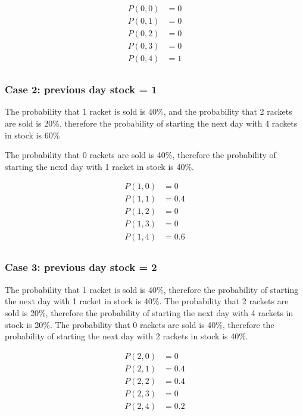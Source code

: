 \documentclass[12pt]{article}
\begin{document}
\begin{enumerate}
\begin{enumerate}
\begin{align*}
P(0, 0) &= 0 \\
P(0, 1) &= 0 \\
P(0, 2) &= 0 \\
P(0, 3) &= 0 \\
P(0, 4) &= 1 \\
\end{align*}

\subsubsection*{Case 2: previous day stock = 1}

The probability that 1 racket is sold is 40\%, and the probability that 2 rackets are sold is 20\%, therefore the probability of starting the next day with 4 rackets in stock is 60\%  

The probability that 0 rackets are sold is 40\%, therefore the probability of starting the nexd day with 1 racket in stock is 40\%.

\begin{align*}
P(1, 0) &= 0 \\
P(1, 1) &= 0.4 \\
P(1, 2) &= 0 \\
P(1, 3) &= 0 \\
P(1, 4) &= 0.6 \\
\end{align*}

\subsubsection*{Case 3: previous day stock = 2}

The probability that 1 racket is sold is 40\%, therefore the probability of starting the next day with 1 racket in stock is 40\%. The probability that 2 rackets are sold is 20\%, therefore the probability of starting the next day with 4 rackets in stock is 20\%. The probability that 0 rackets are sold is 40\%, therefore the probability of starting the next day with 2 rackets in stock is 40\%.

\begin{align*}
P(2, 0) &= 0 \\
P(2, 1) &= 0.4 \\
P(2, 2) &= 0.4 \\
P(2, 3) &= 0 \\
P(2, 4) &= 0.2 \\
\end{align*}


\end{enumerate}
\end{enumerate}
\end{document}
